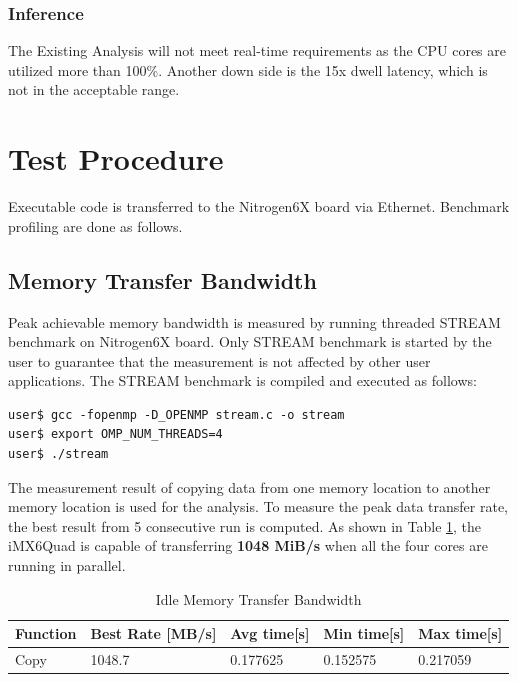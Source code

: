 \subsubsection{Inference}
The Existing Analysis will not meet real-time requirements as the CPU cores are utilized more than 100\%. Another down side is the 15x dwell latency, which is not in the acceptable range.

\clearpage
\section{Test Procedure} 
\label{sec:mm:test_procedure}
Executable code is transferred to the Nitrogen6X board via Ethernet. Benchmark profiling are done as follows.

\subsection{Memory Transfer Bandwidth}
\label{ss:mm:mem_bw}
Peak achievable memory bandwidth is measured by running threaded STREAM benchmark on Nitrogen6X board. Only STREAM benchmark is started by the user to guarantee that the measurement is not affected by other user applications.  The STREAM benchmark is compiled and executed as follows: \\


\begin{lstlisting}
user$ gcc -fopenmp -D_OPENMP stream.c -o stream
user$ export OMP_NUM_THREADS=4
user$ ./stream
\end{lstlisting}

The measurement result of copying data from one memory location to another memory location is used for the  analysis. To measure the peak data transfer rate, the best result from 5 consecutive run is computed. As shown in Table \ref{tbl:mm:bw_no_load}, the iMX6Quad is capable of transferring \textbf{1048 MiB/s} when all the four cores are running in parallel.\\

\begin{table}[h!]
	\centering
	\begin{tabular}{|l|l|l|l|l|} 
	 \hline
	 \textbf{Function} & \textbf{Best Rate [MB/s]} & \textbf{Avg time[s]} & \textbf{Min time[s]} & \textbf{Max time[s]} \\
	 \hline
	 Copy & 1048.7 & 0.177625 & 0.152575 & 0.217059 \\ \hline
	\end{tabular}
	\caption{Idle Memory Transfer Bandwidth}
	\label{tbl:mm:bw_no_load}
\end{table}

